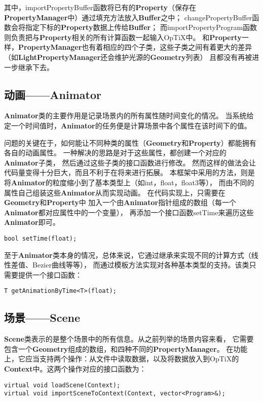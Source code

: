 其中，importPropertyBuffer函数将已有的\textbf{Property}（保存在\textbf{PropertyManager}中）通过填充方法放入\textbf{Buffer}之中；
changePropertyBuffer函数会将指定下标的\textbf{Property}数据上传给\textbf{Buffer}；
而importPropertyProgram函数则负责把与\textbf{Property}相关的所有计算函数一起输入OpTiX中。
和\textbf{Property}一样，\textbf{PropertyManager}也有着相应的四个子类，这些子类之间有着更大的差异（如\textbf{LightPropertyManager}还会维护光源的\textbf{Geometry}列表）
且都没有再被进一步继承下去。

\subsection{动画——Animator}

\textbf{Animator}类的主要作用是记录场景内的所有属性随时间变化的情况。
当系统给定一个时间值时，\textbf{Animator}的任务便是计算场景中各个属性在该时间下的值。

问题的关键在于，如何能让不同种类的属性（\textbf{Geometry}和\textbf{Property}）都能拥有各自的动画属性。
一种解决的思路是对于这些属性，都创建一个对应的\textbf{Animator}子类，
然后通过这些子类的接口函数进行修改。
然而这样的做法会让代码量变得十分巨大，而且不利于在将来进行拓展。
本框架中采用的方法，则是将\textbf{Animator}的粒度缩小到了基本类型上（如int，float，float3等），
而由不同的属性自己组装这些\textbf{Animator}从而实现动画。
在代码实现上，只需要在\textbf{Geometry}和\textbf{Property}中
加入一个由\textbf{Animator}指针组成的数组（每一个\textbf{Animator}都对应属性中的一个变量），
再添加一个接口函数setTime来遍历这些\textbf{Animator}即可。
\lstset{language=C++}
\begin{lstlisting}
bool setTime(float);
\end{lstlisting}

至于\textbf{Animator}类本身的情况，总体来说，它通过继承来实现不同的计算方式（线性差值、Bezier曲线等等），
而通过模板方法实现对各种基本类型的支持。该类只需要提供一个接口函数：
\lstset{language=C++}
\begin{lstlisting}
T getAnimationByTime<T>(float);
\end{lstlisting}



\subsection{场景——Scene}
\textbf{Scene}类表示的是整个场景中的所有信息。从之前列举的场景内容来看，
它需要包含一个\textbf{Geometry}组成的数组，和四种不同的\textbf{PropertyManager}。
在功能上，它应当支持两个操作：从文件中读取数据，以及将数据放入到OpTiX的\textbf{Context}中。这两个操作对应的接口函数为：
\lstset{language=C++}
\begin{lstlisting}
virtual void loadScene(Context);
virtual void importSceneToContext(Context, vector<Program>&);
\end{lstlisting}

